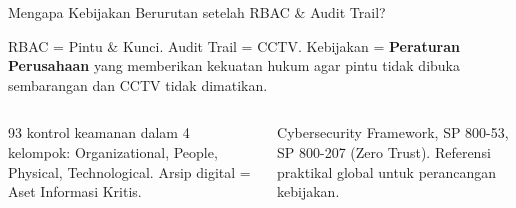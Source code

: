 \documentclass[aspectratio=169,11pt]{beamer}
\begin{document}
\begin{frame}{Mengapa Kebijakan Berurutan setelah RBAC \& Audit Trail?}
    \vspace{0.2cm}
    \begin{premiumbox}[Analogi]
        \small
        RBAC = Pintu \& Kunci. Audit Trail = CCTV. Kebijakan = \textbf{Peraturan Perusahaan} yang memberikan kekuatan hukum agar pintu tidak dibuka sembarangan dan CCTV tidak dimatikan.
    \end{premiumbox}
    
    \begin{columns}[T]
        \begin{orangebox}
            \scriptsize
            93 kontrol keamanan dalam 4 kelompok: Organizational, People, Physical, Technological. Arsip digital = Aset Informasi Kritis.
        \end{orangebox}
        
        \begin{greenbox}[NIST]
            \scriptsize
            Cybersecurity Framework, SP 800-53, SP 800-207 (Zero Trust). Referensi praktikal global untuk perancangan kebijakan.
        \end{greenbox}
    \end{columns}
\end{frame}
\end{document}
